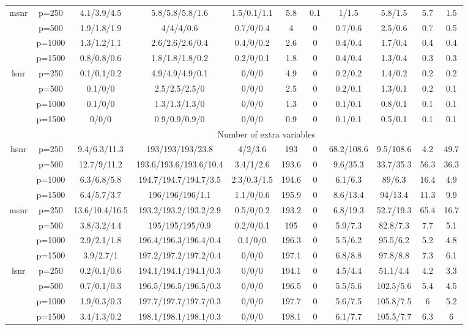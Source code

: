 \begin{table}[ht]
{\begin{tabular}{|c|c|ccccccccc|}
  \midrule\multirow{4}[2]{*}{msnr} & p=250 & 4.1/3.9/4.5 & 5.8/5.8/5.8/1.6 & 1.5/0.1/1.1 & 5.8 & 0.1 & 1/1.5 & 5.8/1.5 & 5.7 & 1.5 \\ 
   & p=500 & 1.9/1.8/1.9 & 4/4/4/0.6 & 0.7/0/0.4 & 4 & 0 & 0.7/0.6 & 2.5/0.6 & 0.7 & 0.5 \\ 
   & p=1000 & 1.3/1.2/1.1 & 2.6/2.6/2.6/0.4 & 0.4/0/0.2 & 2.6 & 0 & 0.4/0.4 & 1.7/0.4 & 0.4 & 0.4 \\ 
   & p=1500 & 0.8/0.8/0.6 & 1.8/1.8/1.8/0.2 & 0.2/0/0.1 & 1.8 & 0 & 0.4/0.4 & 1.3/0.4 & 0.3 & 0.3 \\ 
  \midrule\multirow{4}[2]{*}{lsnr} & p=250 & 0.1/0.1/0.2 & 4.9/4.9/4.9/0.1 & 0/0/0 & 4.9 & 0 & 0.2/0.2 & 1.4/0.2 & 0.2 & 0.2 \\ 
   & p=500 & 0.1/0/0 & 2.5/2.5/2.5/0 & 0/0/0 & 2.5 & 0 & 0.2/0.1 & 1.3/0.1 & 0.2 & 0.1 \\ 
   & p=1000 & 0.1/0/0 & 1.3/1.3/1.3/0 & 0/0/0 & 1.3 & 0 & 0.1/0.1 & 0.8/0.1 & 0.1 & 0.1 \\ 
   & p=1500 & 0/0/0 & 0.9/0.9/0.9/0 & 0/0/0 & 0.9 & 0 & 0.1/0.1 & 0.5/0.1 & 0.1 & 0.1 \\ 
   \midrule 
 \multicolumn{1}{|c}{} &       & \multicolumn{9}{c|}{Number of extra variables} \\
\midrule\multirow{4}[2]{*}{hsnr} & p=250 & 9.4/6.3/11.3 & 193/193/193/23.8 & 4/2/3.6 & 193 & 0 & 68.2/108.6 & 9.5/108.6 & 4.2 & 49.7 \\ 
   & p=500 & 12.7/9/11.2 & 193.6/193.6/193.6/10.4 & 3.4/1/2.6 & 193.6 & 0 & 9.6/35.3 & 33.7/35.3 & 56.3 & 36.3 \\ 
   & p=1000 & 6.3/6.8/5.8 & 194.7/194.7/194.7/3.5 & 2.3/0.3/1.5 & 194.6 & 0 & 6.1/6.3 & 89/6.3 & 16.4 & 4.9 \\ 
   & p=1500 & 6.4/5.7/3.7 & 196/196/196/1.1 & 1.1/0/0.6 & 195.9 & 0 & 8.6/13.4 & 94/13.4 & 11.3 & 9.9 \\ 
  \midrule\multirow{4}[2]{*}{msnr} & p=250 & 13.6/10.4/16.5 & 193.2/193.2/193.2/2.9 & 0.5/0/0.2 & 193.2 & 0 & 6.8/19.3 & 52.7/19.3 & 65.4 & 16.7 \\ 
   & p=500 & 3.8/3.2/4.4 & 195/195/195/0.9 & 0.2/0/0.1 & 195 & 0 & 5.9/7.3 & 82.8/7.3 & 7.7 & 5.1 \\ 
   & p=1000 & 2.9/2.1/1.8 & 196.4/196.3/196.4/0.4 & 0.1/0/0 & 196.3 & 0 & 5.5/6.2 & 95.5/6.2 & 5.2 & 4.8 \\ 
   & p=1500 & 3.9/2.7/1 & 197.2/197.2/197.2/0.4 & 0/0/0 & 197.1 & 0 & 6.8/8.8 & 97.8/8.8 & 7.3 & 6.1 \\ 
  \midrule\multirow{4}[2]{*}{lsnr} & p=250 & 0.2/0.1/0.6 & 194.1/194.1/194.1/0.3 & 0/0/0 & 194.1 & 0 & 4.5/4.4 & 51.1/4.4 & 4.2 & 3.3 \\ 
   & p=500 & 0.7/0.1/0.3 & 196.5/196.5/196.5/0.3 & 0/0/0 & 196.5 & 0 & 5.5/5.6 & 102.5/5.6 & 5.4 & 4.5 \\ 
   & p=1000 & 1.9/0.3/0.3 & 197.7/197.7/197.7/0.3 & 0/0/0 & 197.7 & 0 & 5.6/7.5 & 105.8/7.5 & 6 & 5.2 \\ 
   & p=1500 & 3.4/1.3/0.2 & 198.1/198.1/198.1/0.3 & 0/0/0 & 198.1 & 0 & 6.1/7.7 & 105.5/7.7 & 6.3 & 6 \\ 
   \bottomrule 
\end{tabular}
}
\end{table}
